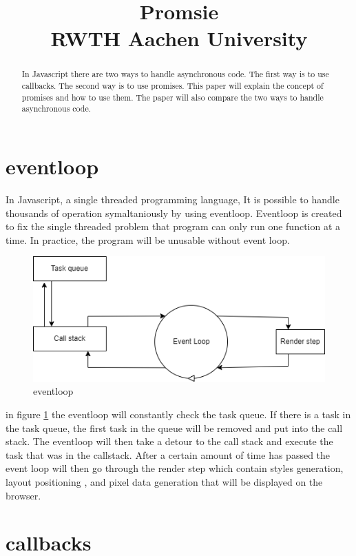 \documentclass[11pt,a4paper,onecolumn]{IEEEtran}
\title{Promsie\\
{\footnotesize RWTH Aachen University}}
\author{
  \IEEEauthorblockN{1\textsuperscript{st} Papop Lekhapanyaporn}
  \and
  \IEEEauthorblockN{2\textsuperscript{nd} Tobias Piatek}
  \and
  \IEEEauthorblockN{3\textsuperscript{rd} Tobias Waerder}
  }
\begin{document}
\maketitle

\begin{abstract}
  In Javascript there are two ways to handle asynchronous code. The first way is to use callbacks. The second way is to use promises. This paper will explain the concept of promises and how to use them. The paper will also compare the two ways to handle asynchronous code.
\end{abstract}

\section{eventloop}
In Javascript, a single threaded programming language, It is possible to handle thousands of operation symaltaniously by 
using eventloop. Eventloop is created to fix the single threaded problem that program can only run one function at a time. 
In practice, the program will be unusable without event loop. 
\begin{figure}[h]
  \centering
  \includegraphics[scale=0.5]{eventloop}
  \caption{eventloop}
  \label{fig:eventloop}
\end{figure}

in figure \ref{fig:eventloop} the eventloop will constantly check the task queue. 
If there is a task in the task queue, the first task in the queue will be removed and put into the call stack.
The eventloop will then take a detour to the call stack and execute the task that was in the callstack.
After a certain amount of time has passed the event loop will then go through the render step which contain styles generation,
layout positioning , and pixel data generation that will be displayed on the browser.
\section{callbacks}
\end{document}
